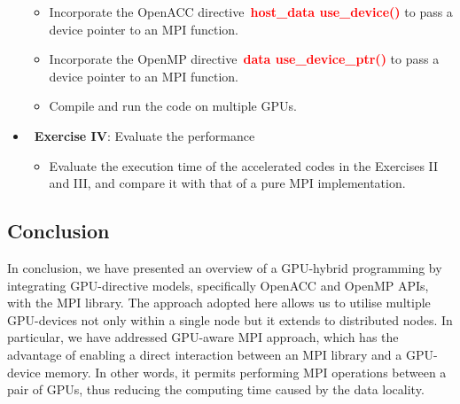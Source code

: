 \begin{itemize}
    \begin{itemize}
        \item Incorporate the OpenACC directive~\textbf{\textcolor{red}{host\_data use\_device()}} to pass a device pointer to an MPI function.
        \item Incorporate the OpenMP directive~\textbf{\textcolor{red}{data use\_device\_ptr()}} to pass a device pointer to an MPI function.
        \item Compile and run the code on multiple GPUs.
    \end{itemize}
    \item~\textbf{Exercise IV}: Evaluate the performance
    \begin{itemize}
        \item Evaluate the execution time of the accelerated codes in the Exercises II and III, and compare it with that of a pure MPI implementation.
    \end{itemize}
\end{itemize}




\subsection{Conclusion}


\par
In conclusion, we have presented an overview of a GPU-hybrid programming by integrating GPU-directive models, specifically OpenACC and OpenMP APIs, with the MPI library.
The approach adopted here allows us to utilise multiple GPU-devices not only within a single node but it extends to distributed nodes.
In particular, we have addressed GPU-aware MPI approach, which has the advantage of enabling a direct interaction between an MPI library and a GPU-device memory.
In other words, it permits performing MPI operations between a pair of GPUs, thus reducing the computing time caused by the data locality.


